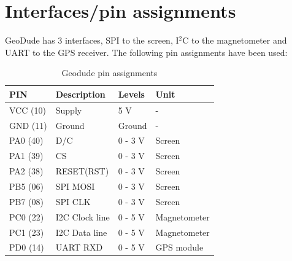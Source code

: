 \section{Interfaces/pin assignments}
GeoDude has 3 interfaces, SPI to the screen, I$^2$C to the magnetometer and UART to the GPS receiver.
The following pin assignments have been used:
\begin{table}[H]
\centering
    \begin{tabular}{|l|l|l|l|}
    \hline
    PIN 		& Description    & Levels 	& Unit  \\ \hline
    VCC (10) 	& Supply         & 5 V    	& -		\\ \hline
    GND (11) 	& Ground         & Ground  	& -		\\ \hline
    PA0 (40)	& D/C			 & 0 - 3 V	& Screen \\ \hline
    PA1 (39)	& CS			 & 0 - 3 V  & Screen \\ \hline
    PA2 (38)	& RESET(RST)	 & 0 - 3 V  & Screen \\ \hline
    PB5	(06)	& SPI MOSI		 & 0 - 3 V  & Screen \\ \hline
    PB7 (08)	& SPI CLK		 & 0 - 3 V  & Screen \\ \hline
    PC0 (22) 	& I2C Clock line & 0 - 5 V 	& Magnetometer 	\\ \hline
    PC1 (23) 	& I2C Data line  & 0 - 5 V 	& Magnetometer		\\ \hline
    PD0 (14)	& UART RXD		 & 0 - 5 V	& GPS module \\ \hline
    \end{tabular}
    \caption{Geodude pin assignments}
\end{table}


